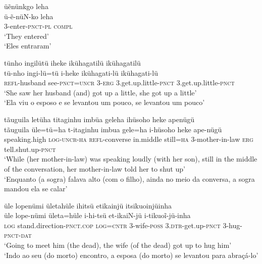 \documentclass[output=paper,
modfonts,nonflat
]{langsci/langscibook}
\begin{document}
\ea üẽnünkgo leha \\[.3em]
\gll ü-ẽ-nüN-ko		leha \\
3-enter-\textsc{pnct-pl} 	\textsc{compl}  \\
\glt ‘They entered’ \\
‘Eles entraram’ \\
\z

\ea tünho ingilütü iheke ikühagatilü ikühagatilü  \\[.3em]
\gll tü-nho			ingi-lü=tü		i-heke	ikühagati-lü 		ikühagati-lü \\
\textsc{refl-}husband	see-\textsc{pnct=uncr} 	\textsc{3-erg}	3.get.up.little-\textsc{pnct} 3.get.up.little-\textsc{pnct} \\
\glt ‘She saw her husband (and) got up a little, she got up a little’ \\
‘Ela viu o esposo e se levantou um pouco, se levantou um pouco’ \\
\z

\largerpage
\ea tãuguila letüha titaginhu imbüa geleha ihüsoho heke apenügü \\[.3em]
\gll tãuguila üle=tü=ha t-itaginhu	imbua gele=ha i-hüsoho heke	ape-nügü \\
speaking.high \textsc{log-uncr-ha} \textsc{refl}-converse in.middle	still\textsc{=ha} 3-mother-in-law \textsc{erg} tell.shut.up-\textsc{pnct} \\
\glt ‘While (her mother-in-law) was speaking loudly (with her son), still in the middle of the conversation, her mother-in-law told her to shut up’ \\
‘Enquanto (a sogra) falava alto (com o filho), ainda no meio da conversa, a sogra mandou ela se calar’ \\
\z

\ea üle lopenümi ületahüle ihitsü etikainjü itsikuoinjüinha \\[.3em]
\gll üle	lope-nümi 	ületa=hüle 	i-hi-tsü et-ikaiN-jü i-tikuoĩ-jü-inha \\
\textsc{log} stand.direction-\textsc{pnct.cop} \textsc{log=cntr} 3-wife\textsc{-poss} \textsc{3.dtr-}get.up\textsc{-pnct} 3-hug-\textsc{pnct-dat} \\
\glt‘Going to meet him (the dead), the wife (of the dead) got up to hug him’ \\
‘Indo ao seu (do morto) encontro, a esposa (do morto) se levantou para abraçá-lo’{\footnotemark} \\
\z
\end{document}
